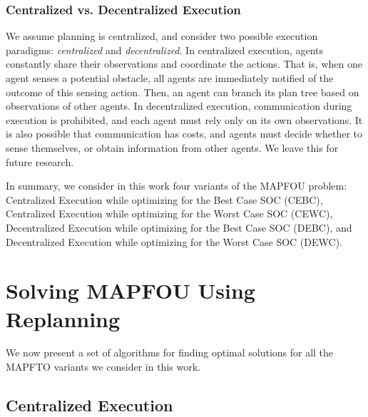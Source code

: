\documentclass[letterpaper]{article} %
\begin{document}
\subsubsection*{Centralized vs. Decentralized Execution}
We assume planning is centralized, and consider two possible execution paradigms: \emph{centralized} and \emph{decentralized}. In centralized execution, agents constantly share their observations and coordinate the actions. That is, when one agent senses a potential obstacle, all agents are immediately notified of the outcome of this sensing action. Then, an agent can branch its plan tree based on observations of other agents.
In decentralized execution, communication during execution is prohibited, and each agent must rely only on its own observations.
It is also possible that communication has costs, and agents must decide whether to sense themselves, or obtain information from other agents. We leave this for future research.




In summary, we consider in this work four variants of the MAPFOU problem:
Centralized Execution while optimizing for the Best Case SOC (CEBC),
Centralized Execution while optimizing for the Worst Case SOC (CEWC),
Decentralized Execution while optimizing for the Best Case SOC (DEBC), and
Decentralized Execution while optimizing for the Worst Case SOC (DEWC).

\section{Solving MAPFOU Using Replanning}

We now present a set of algorithms for finding optimal solutions for all the MAPFTO variants we consider in this work.




\subsection{Centralized Execution}

\end{document}
